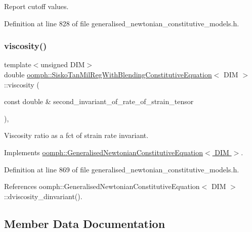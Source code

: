 Report cutoff values. 



Definition at line 828 of file generalised\+\_\+newtonian\+\_\+constitutive\+\_\+models.\+h.

\mbox{\label{classoomph_1_1SiskoTanMilRegWithBlendingConstitutiveEquation_aab87a911e6c87d5126240a756ea1a5fe}} 
\subsubsection{\texorpdfstring{viscosity()}{viscosity()}}
{\footnotesize\ttfamily template$<$unsigned D\+IM$>$ \\
double \hyperlink{classoomph_1_1SiskoTanMilRegWithBlendingConstitutiveEquation}{oomph\+::\+Sisko\+Tan\+Mil\+Reg\+With\+Blending\+Constitutive\+Equation}$<$ D\+IM $>$\+::viscosity (\begin{DoxyParamCaption}\item[{const double \&}]{second\+\_\+invariant\+\_\+of\+\_\+rate\+\_\+of\+\_\+strain\+\_\+tensor }\end{DoxyParamCaption})\hspace{0.3cm}{\ttfamily [inline]}, {\ttfamily [virtual]}}



Viscosity ratio as a fct of strain rate invariant. 



Implements \hyperlink{classoomph_1_1GeneralisedNewtonianConstitutiveEquation_a3e6d811786e39ca3c3a9b1c46249442f}{oomph\+::\+Generalised\+Newtonian\+Constitutive\+Equation$<$ D\+I\+M $>$}.



Definition at line 869 of file generalised\+\_\+newtonian\+\_\+constitutive\+\_\+models.\+h.



References oomph\+::\+Generalised\+Newtonian\+Constitutive\+Equation$<$ D\+I\+M $>$\+::dviscosity\+\_\+dinvariant().



\subsection{Member Data Documentation}
\mbox{\label{classoomph_1_1SiskoTanMilRegWithBlendingConstitutiveEquation_a33df82ccf7720d8e9bee3be5e4cf4781}} 

